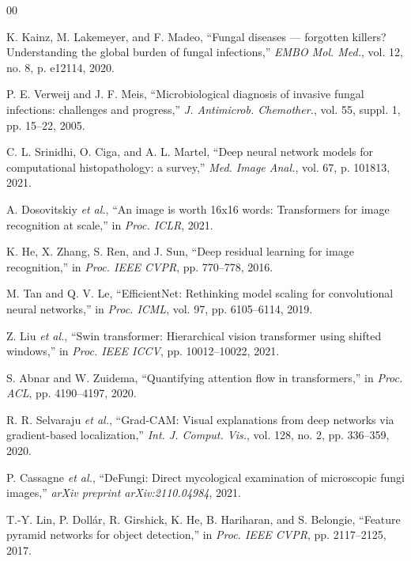 \documentclass[conference]{IEEEtran}
\begin{document}
\vspace{-2pt}
{\small
\begin{thebibliography}{00}

K. Kainz, M. Lakemeyer, and F. Madeo,
``Fungal diseases --- forgotten killers? Understanding the global burden
of fungal infections,''
\textit{EMBO Mol. Med.}, vol. 12, no. 8, p. e12114, 2020.

P. E. Verweij and J. F. Meis,
``Microbiological diagnosis of invasive fungal infections: challenges and
progress,''
\textit{J. Antimicrob. Chemother.}, vol. 55, suppl. 1, pp. 15--22, 2005.

C. L. Srinidhi, O. Ciga, and A. L. Martel,
``Deep neural network models for computational histopathology: a survey,''
\textit{Med. Image Anal.}, vol. 67, p. 101813, 2021.

A. Dosovitskiy \textit{et al.},
``An image is worth 16x16 words: Transformers for image recognition at scale,''
in \textit{Proc. ICLR}, 2021.

K. He, X. Zhang, S. Ren, and J. Sun,
``Deep residual learning for image recognition,''
in \textit{Proc. IEEE CVPR}, pp. 770--778, 2016.

M. Tan and Q. V. Le,
``EfficientNet: Rethinking model scaling for convolutional neural networks,''
in \textit{Proc. ICML}, vol. 97, pp. 6105--6114, 2019.

Z. Liu \textit{et al.},
``Swin transformer: Hierarchical vision transformer using shifted windows,''
in \textit{Proc. IEEE ICCV}, pp. 10012--10022, 2021.

S. Abnar and W. Zuidema,
``Quantifying attention flow in transformers,''
in \textit{Proc. ACL}, pp. 4190--4197, 2020.

R. R. Selvaraju \textit{et al.},
``Grad-CAM: Visual explanations from deep networks via gradient-based
localization,''
\textit{Int. J. Comput. Vis.}, vol. 128, no. 2, pp. 336--359, 2020.

P. Cassagne \textit{et al.},
``DeFungi: Direct mycological examination of microscopic fungi images,''
\textit{arXiv preprint arXiv:2110.04984}, 2021.

T.-Y. Lin, P. Doll\'{a}r, R. Girshick, K. He, B. Hariharan, and S. Belongie,
``Feature pyramid networks for object detection,''
in \textit{Proc. IEEE CVPR}, pp. 2117--2125, 2017.


\end{thebibliography}}
\end{document}
